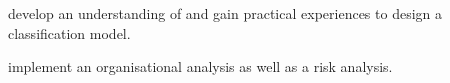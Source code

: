 \item develop an understanding of and gain practical experiences to design a
classification model.
\item  implement an organisational analysis as well as a risk analysis.
